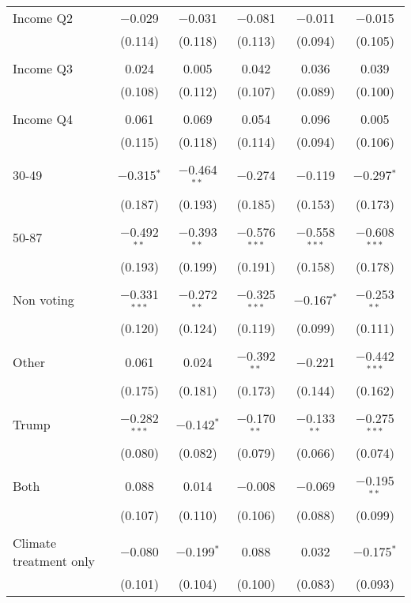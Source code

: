 \begin{tabular}{@{\extracolsep{5pt}}lccccc}
 Income Q2 & $-$0.029 & $-$0.031 & $-$0.081 & $-$0.011 & $-$0.015 \\ 
  & (0.114) & (0.118) & (0.113) & (0.094) & (0.105) \\ 
  & & & & & \\ 
 Income Q3 & 0.024 & 0.005 & 0.042 & 0.036 & 0.039 \\ 
  & (0.108) & (0.112) & (0.107) & (0.089) & (0.100) \\ 
  & & & & & \\ 
 Income Q4 & 0.061 & 0.069 & 0.054 & 0.096 & 0.005 \\ 
  & (0.115) & (0.118) & (0.114) & (0.094) & (0.106) \\ 
  & & & & & \\ 
 30-49 & $-$0.315$^{*}$ & $-$0.464$^{**}$ & $-$0.274 & $-$0.119 & $-$0.297$^{*}$ \\ 
  & (0.187) & (0.193) & (0.185) & (0.153) & (0.173) \\ 
  & & & & & \\ 
 50-87 & $-$0.492$^{**}$ & $-$0.393$^{**}$ & $-$0.576$^{***}$ & $-$0.558$^{***}$ & $-$0.608$^{***}$ \\ 
  & (0.193) & (0.199) & (0.191) & (0.158) & (0.178) \\ 
  & & & & & \\ 
 Non voting & $-$0.331$^{***}$ & $-$0.272$^{**}$ & $-$0.325$^{***}$ & $-$0.167$^{*}$ & $-$0.253$^{**}$ \\ 
  & (0.120) & (0.124) & (0.119) & (0.099) & (0.111) \\ 
  & & & & & \\ 
 Other & 0.061 & 0.024 & $-$0.392$^{**}$ & $-$0.221 & $-$0.442$^{***}$ \\ 
  & (0.175) & (0.181) & (0.173) & (0.144) & (0.162) \\ 
  & & & & & \\ 
 Trump & $-$0.282$^{***}$ & $-$0.142$^{*}$ & $-$0.170$^{**}$ & $-$0.133$^{**}$ & $-$0.275$^{***}$ \\ 
  & (0.080) & (0.082) & (0.079) & (0.066) & (0.074) \\ 
  & & & & & \\ 
 Both & 0.088 & 0.014 & $-$0.008 & $-$0.069 & $-$0.195$^{**}$ \\ 
  & (0.107) & (0.110) & (0.106) & (0.088) & (0.099) \\ 
  & & & & & \\ 
 Climate treatment only & $-$0.080 & $-$0.199$^{*}$ & 0.088 & 0.032 & $-$0.175$^{*}$ \\ 
  & (0.101) & (0.104) & (0.100) & (0.083) & (0.093) \\ 

\end{tabular}
